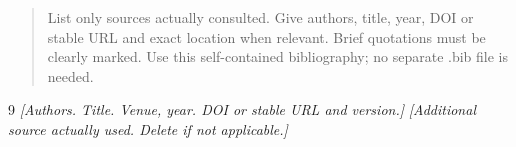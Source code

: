 \documentclass[11pt]{article}
\newcommand{\prompt}[1]{\textit{\textcolor{promptink}{[#1]}}}
\newcommand{\guidance}[1]{\begin{quote}\small #1\end{quote}}
\begin{document}
\guidance{List only sources actually consulted. Give authors, title, year, DOI or
stable URL and exact location when relevant. Brief quotations must be clearly
marked. Use this self-contained bibliography; no separate .bib file is needed.}
\begin{thebibliography}{9}
 \prompt{Authors. Title. Venue, year. DOI or stable URL and version.}
 \prompt{Additional source actually used. Delete if not applicable.}
\end{thebibliography}
\end{document}
